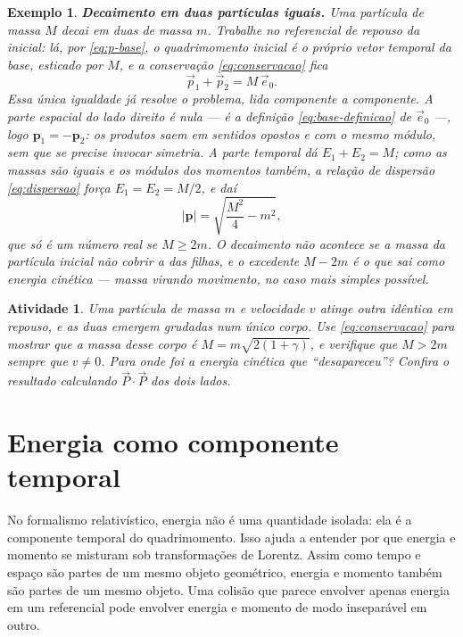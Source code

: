 \documentclass[12pt,a4paper,oneside]{book}
\theoremstyle{rgplain}
\newtheorem{example}{Exemplo}[chapter]
\newtheorem{activity}{Atividade}[chapter]
\theoremstyle{rgremark}
\begin{document}
\begin{example}
\textbf{Decaimento em duas partículas iguais.} Uma partícula de massa $M$ decai
em duas de massa $m$. Trabalhe no referencial de repouso da inicial: lá, por
\eqref{eq:p-base}, o quadrimomento inicial é o próprio vetor temporal da base,
esticado por $M$, e a conservação \eqref{eq:conservacao} fica
\[
  \vec p_1+\vec p_2=M\,\vec e_0 .
\]
Essa única igualdade já resolve o problema, lida componente a componente. A
parte espacial do lado direito é nula --- é a definição \eqref{eq:base-definicao}
de $\vec e_0$ ---, logo $\bm p_1=-\bm p_2$: os produtos saem em sentidos
opostos e com o mesmo módulo, sem que se precise invocar simetria. A parte
temporal dá $E_1+E_2=M$; como as massas são iguais e os módulos dos momentos
também, a relação de dispersão \eqref{eq:dispersao} força $E_1=E_2=M/2$, e daí
\[
  |\bm p|=\sqrt{\frac{M^2}{4}-m^2},
\]
que só é um número real se $M\ge 2m$. O decaimento não acontece se a massa da
partícula inicial não cobrir a das filhas, e o excedente $M-2m$ é o que sai
como energia cinética --- massa virando movimento, no caso mais simples
possível.
\end{example}

\begin{activity}
Uma partícula de massa $m$ e velocidade $v$ atinge outra idêntica em repouso, e
as duas emergem grudadas num único corpo. Use \eqref{eq:conservacao} para
mostrar que a massa desse corpo é $M=m\sqrt{2(1+\gamma)}$, e verifique que
$M>2m$ sempre que $v\neq 0$. Para onde foi a energia cinética que
``desapareceu''? Confira o resultado calculando $\vec P\cdot\vec P$ dos dois
lados.
\end{activity}

\section{Energia como componente temporal}
\label{sec:energia-temporal}

No formalismo relativístico, energia não é uma quantidade isolada: ela é a
componente temporal do quadrimomento. Isso ajuda a entender por que energia e
momento se misturam sob transformações de Lorentz. Assim como tempo e espaço
são partes de um mesmo objeto geométrico, energia e momento também são partes
de um mesmo objeto. Uma colisão que parece envolver apenas energia em um
referencial pode envolver energia e momento de modo inseparável em outro.
\end{document}
